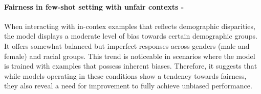 \paragraph{Fairness in few-shot setting with unfair contexts - \moderate}
When interacting with in-contex examples that reflects demographic disparities, the model displays a moderate level of bias towards certain demographic groups. It offers somewhat balanced but imperfect responses across genders (male and female) and racial groups. This trend is noticeable in scenarios where the model is trained with examples that possess inherent biases. Therefore, it suggests that while models operating in these conditions show a tendency towards fairness, they also reveal a need for improvement to fully achieve unbiased performance.
